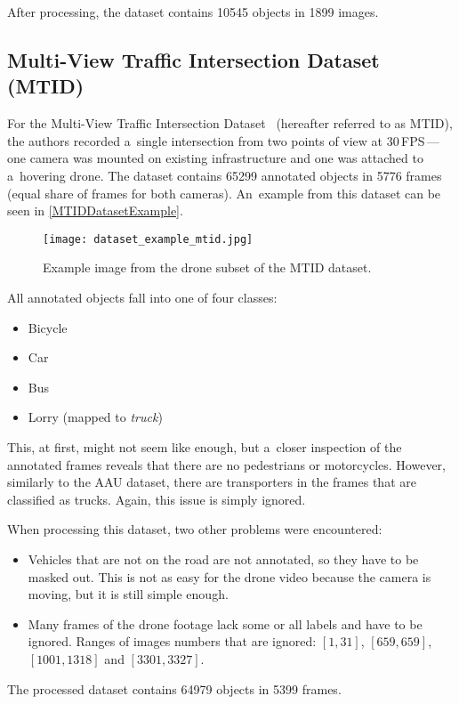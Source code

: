 After processing, the dataset contains \num{10545} objects in \num{1899} images.


\subsection{Multi-View Traffic Intersection Dataset (MTID)}

For the Multi-View Traffic Intersection Dataset~\cite{Jensen2020} (hereafter referred to as MTID), the
authors recorded a~single intersection from two points of view at 30\,FPS\,---\,one
camera was mounted on existing infrastructure and one was attached to a~hovering
drone. The dataset contains \num{65299} annotated objects in \num{5776} frames
(equal share of frames for both cameras). An~example from this dataset can be
seen in \autoref{MTIDDatasetExample}.

\begin{figure}[t]
    \centering
    \texttt{[image: dataset\_example\_mtid.jpg]}
    \captionsetup{width=0.8\textwidth}
    \caption{Example image from the drone subset of the MTID dataset.}
    \label{MTIDDatasetExample}
\end{figure}

All annotated objects fall into one of four classes:
\begin{itemize}
    \item Bicycle
    \item Car
    \item Bus
    \item Lorry (mapped to \textit{truck})
\end{itemize}
This, at first, might not seem like enough, but a~closer inspection of the
annotated frames reveals that there are no pedestrians or motorcycles. However,
similarly to the AAU dataset, there are transporters in the frames
that are classified as trucks. Again, this issue is simply ignored.

When processing this dataset, two other problems were encountered:
\begin{itemize}
    \item Vehicles that are not on the road are not annotated, so they have to
    be masked out. This is not as easy for the drone video because the camera is
    moving, but it is still simple enough.
    \item Many frames of the drone footage lack some or all labels and have to
    be ignored. Ranges of images numbers that are ignored: $[1,31]$,
    $[659,659]$, $[1001,1318]$ and $[3301,3327]$.
\end{itemize}
The processed dataset contains \num{64979} objects in \num{5399} frames.


